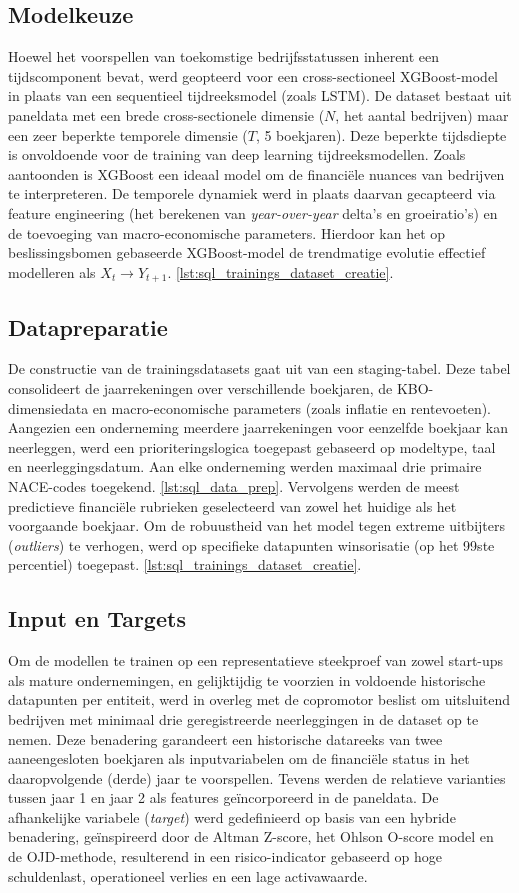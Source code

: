 \subsection{Modelkeuze}
Hoewel het voorspellen van toekomstige bedrijfsstatussen inherent een tijdscomponent bevat, werd geopteerd voor een cross-sectioneel XGBoost-model in plaats van een sequentieel tijdreeksmodel (zoals LSTM). De dataset bestaat uit paneldata met een brede cross-sectionele dimensie ($N$, het aantal bedrijven) maar een zeer beperkte temporele dimensie ($T$, 5 boekjaren). Deze beperkte tijdsdiepte is onvoldoende voor de training van deep learning tijdreeksmodellen. 
Zoals \autocite{chen2024} aantoonden is XGBoost een ideaal model om de financiële nuances van bedrijven te interpreteren. De temporele dynamiek werd in plaats daarvan gecapteerd via feature engineering (het berekenen van \textit{year-over-year} delta's en groeiratio's) en de toevoeging van macro-economische parameters. Hierdoor kan het op beslissingsbomen gebaseerde XGBoost-model de trendmatige evolutie effectief modelleren als $X_t \rightarrow Y_{t+1}$.
\ref{lst:sql_trainings_dataset_creatie}.
\subsection{Datapreparatie}
De constructie van de trainingsdatasets gaat uit van een staging-tabel. Deze tabel consolideert de jaarrekeningen over verschillende boekjaren, de KBO-dimensiedata en macro-economische parameters (zoals inflatie en rentevoeten). Aangezien een onderneming meerdere jaarrekeningen voor eenzelfde boekjaar kan neerleggen, werd een prioriteringslogica toegepast gebaseerd op modeltype, taal en neerleggingsdatum. Aan elke onderneming werden maximaal drie primaire NACE-codes toegekend.
\ref{lst:sql_data_prep}.
Vervolgens werden de meest predictieve financiële rubrieken geselecteerd van zowel het huidige als het voorgaande boekjaar. Om de robuustheid van het model tegen extreme uitbijters (\textit{outliers}) te verhogen, werd op specifieke datapunten winsorisatie (op het 99ste percentiel) toegepast.
\ref{lst:sql_trainings_dataset_creatie}.

\subsection{Input en Targets}
Om de modellen te trainen op een representatieve steekproef van zowel start-ups als mature ondernemingen, en gelijktijdig te voorzien in voldoende historische datapunten per entiteit, werd in overleg met de copromotor beslist om uitsluitend bedrijven met minimaal drie geregistreerde neerleggingen in de dataset op te nemen. Deze benadering garandeert een historische datareeks van twee aaneengesloten boekjaren als inputvariabelen om de financiële status in het daaropvolgende (derde) jaar te voorspellen. Tevens werden de relatieve varianties tussen jaar 1 en jaar 2 als features geïncorporeerd in de paneldata.
De afhankelijke variabele (\textit{target}) werd gedefinieerd op basis van een hybride benadering, geïnspireerd door de Altman Z-score, het Ohlson O-score model en de OJD-methode, resulterend in een risico-indicator gebaseerd op hoge schuldenlast, operationeel verlies en een lage activawaarde.

